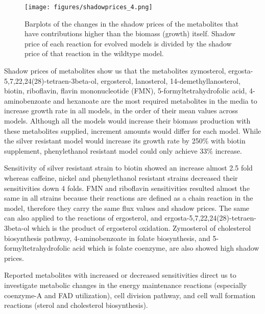 \baselineskip


\begin{figure}[H]
  \begin{center}
  \texttt{[image: figures/shadowprices\_4.png]}
  \caption[Barplots of the changes in the shadow prices of the metabolites that have contributions higher than the biomass (growth) itself. Shadow price of each reaction for evolved models is divided by the shadow price of that reaction in the wildtype model]{Barplots of the changes in the shadow prices of the metabolites that have contributions higher than the biomass (growth) itself. Shadow price of each reaction for evolved models is divided by the shadow price of that reaction in the wildtype model.}
  \label{fig:fba_shadowprices_free}
  \end{center}
\end{figure}

Shadow prices of metabolites show us that the metabolites zymosterol, ergosta-5,7,22,24(28)-tetraen-3beta-ol, ergosterol, lanosterol, 14-demethyllanosterol, biotin, riboflavin, flavin mononucleotide (FMN), 5-formyltetrahydrofolic acid, 4-aminobenzoate and hexanoate are the most required metabolites in the media to increase growth rate in all models, in the order of their mean values across models. Although all the models would increase their biomass production with these metabolites supplied, increment amounts would differ for each model. While the silver resistant model would increase its growth rate by 250\% with biotin supplement, phenylethanol resistant model could only achieve 33\% increase.

Sensitivity of silver resistant strain to biotin showed an increase almost 2.5 fold whereas caffeine, nickel and phenylethanol resistant strains decreased their sensitivities down 4 folds. FMN and riboflavin sensitivities resulted almost the same in all strains because their reactions are defined as a chain reaction in the model, therefore they carry the same flux values and shadow prices. The same can also applied to the reactions of ergosterol, and ergosta-5,7,22,24(28)-tetraen-3beta-ol which is the product of ergosterol oxidation. Zymosterol of cholesterol biosynthesis pathway, 4-aminobenzoate in folate biosynthesis, and 5-formyltetrahydrofolic acid which is folate coenzyme, are also showed high shadow prices.

Reported metabolites with increased or decreased sensitivities direct us to investigate metabolic changes in the energy maintenance reactions (especially coenzyme-A and FAD utilization), cell division pathway, and cell wall formation reactions (sterol and cholesterol biosynthesis).


